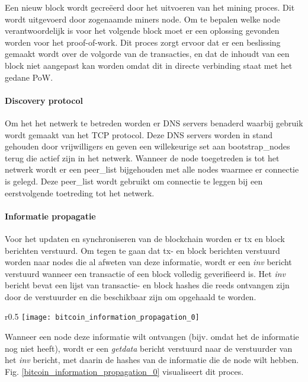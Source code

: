 \clearpage
Een nieuw block wordt gecreëerd door het uitvoeren van het mining proces. Dit wordt uitgevoerd door zogenaamde \glspl{miner} node. Om te bepalen welke \gls{node} verantwoordelijk is voor het volgende block moet er een oplossing gevonden worden voor het proof-of-work. Dit proces zorgt ervoor dat er een beslissing gemaakt wordt over de volgorde van de transacties, en dat de inhoudt van een block niet aangepast kan worden omdat dit in directe verbinding staat met het gedane \acrshort{PoW}.

\paragraph{Discovery protocol}

Om het het netwerk te betreden worden er DNS servers benaderd waarbij gebruik wordt gemaakt van het TCP protocol. Deze DNS servers worden in stand gehouden door vrijwilligers en geven een willekeurige set aan \glspl{bootstrap_node} terug die actief zijn in het netwerk. Wanneer de \gls{node} toegetreden is tot het netwerk wordt er een \gls{peer_list} bijgehouden met alle \glspl{node} waarmee er connectie is gelegd. Deze \gls{peer_list} wordt gebruikt om connectie te leggen bij een eerstvolgende toetreding tot het netwerk.

\paragraph{Informatie propagatie}

Voor het updaten en synchroniseren van de blockchain worden er \acrfull{tx} en block berichten verstuurd. Om tegen te gaan dat \acrshort{tx}- en block berichten verstuurd worden naar \glspl{node} die al afweten van deze informatie, wordt er een \textit{inv} bericht verstuurd wanneer een transactie of een block volledig geverifieerd is. Het \textit{inv} bericht bevat een lijst van transactie- en block hashes die reeds ontvangen zijn door de verstuurder en die beschikbaar zijn om opgehaald te worden. 
\begin{wrapfigure}{r}{0.5\textwidth}
  \texttt{[image: bitcoin\_information\_propagation\_0]}
  \caption[Communicatie tussen deelnemers in Bitcoin]{Berichten die verzonden worden om informatie over een block uit te wisselen \citep[p.~4]{6688704}.}
  \label{bitcoin_information_propagation_0}
\end{wrapfigure}

Wanneer een \gls{node} deze informatie wilt ontvangen (bijv. omdat het de informatie nog niet heeft), wordt er een \textit{getdata} bericht verstuurd naar de verstuurder van het \textit{inv} bericht, met daarin de hashes van de informatie die de \gls{node} wilt hebben. Fig. \ref{bitcoin_information_propagation_0} visualiseert dit proces.